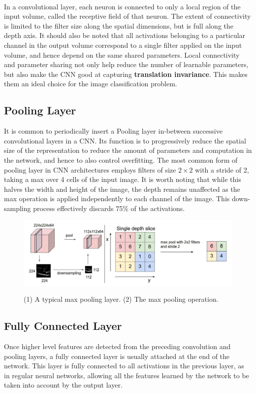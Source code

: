 \documentclass[12pt, a4paper]{report}
\begin{document}
\paragraph{}
In a convolutional layer, each neuron is connected to only a local region of the input volume, called the receptive field of that neuron. The extent of connectivity is limited to the filter size along the spatial dimensions, but is full along the depth axis.\cite{cs231n} It should also be noted that all activations belonging to a particular channel in the output volume correspond to a single filter applied on the input volume, and hence depend on the same shared parameters. Local connectivity and parameter sharing not only help reduce the number of learnable parameters, but also make the CNN good at capturing \textbf{translation invariance}. This makes them an ideal choice for the image classification problem.
\subsection{Pooling Layer}
It is common to periodically insert a Pooling layer in-between successive convolutional layers in a CNN. Its function is to progressively reduce the spatial size of the representation to reduce the amount of parameters and computation in the network, and hence to also control overfitting.\cite{cs231n} The most common form of pooling layer in CNN architectures employs filters of size $2 \times 2$ with a stride of 2, taking a max over 4 cells of the input image. It is worth noting that while this halves the width and height of the image, the depth remains unaffected as the max operation is applied independently to each channel of the image. This down-sampling process effectively discards 75\% of the activations.
\begin{figure}[h]
\centering
\includegraphics[width=\textwidth]{cnn2.jpg}
\caption{(1) A typical max pooling layer. (2) The max pooling operation.}\cite{cs231n}
\end{figure}
\subsection{Fully Connected Layer}
Once higher level features are detected from the preceding convolution and pooling layers, a fully connected layer is usually attached at the end of the network. This layer is fully connected to all activations in the previous layer, as in regular neural networks, allowing all the features learned by the network to be taken into account by the output layer.
\end{document}
